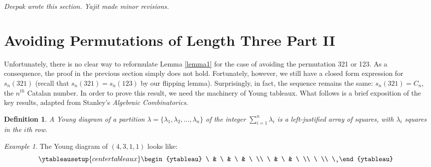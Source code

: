 \documentclass[11pt,letterpaper,twoside,english]{article}
\theoremstyle{theorem}
\newtheorem{definition}[theorem]{Definition}
\theoremstyle{remark}
\newtheorem{example}[theorem]{Example}
\begin{document}
\emph{Deepak wrote this section. Yajit made minor revisions.}


\section{Avoiding Permutations of Length Three Part II}

\label{321}
Unfortunately, there is no clear way to reformulate Lemma \ref{lemma1} for the case of avoiding the permutation 321 or 123. As a consequence, the proof in the previous section simply does not hold. Fortunately, however, we still have a closed form expression for $s_n(321)$ (recall that $s_n(321)=s_n(123)$ by our flipping lemma). Surprisingly, in fact, the sequence remains the same: $s_n(321)=C_n$, the $n^{th}$ Catalan number. In order to prove this result, we need the machinery of Young tableaux. What follows is a brief exposition of the key results, adapted from Stanley's \emph{Algebraic Combinatorics}.

\begin{definition}
A Young diagram of a partition $\lambda=\{\lambda_1, \lambda_2, \ldots, \lambda_n\}$ of the integer $\sum_{i=1}^n \lambda_i$ is a left-justified array of squares, with $\lambda_i$ squares in the $i$th row.
\end{definition}
\begin{example}
The Young diagram of $(4, 3, 1, 1)$ looks like:
\[
\ytableausetup{centertableaux}
\begin{ytableau}
\ & \ & \ & \ \\
\ & \ & \ \\
\ \\
\
\end{ytableau}
\]
\end{example}
\end{document}
